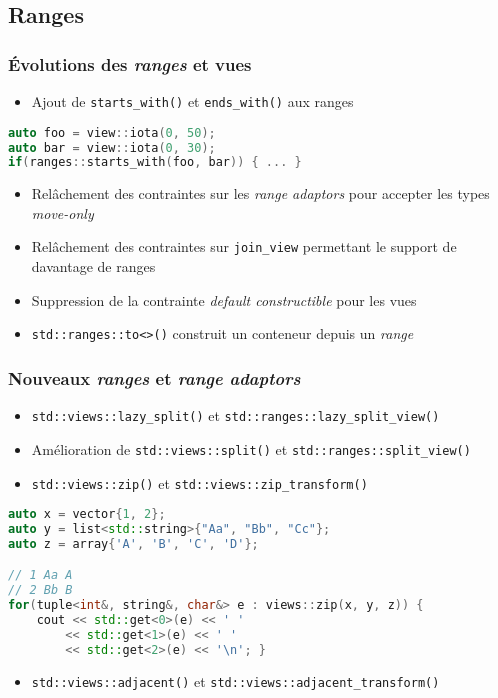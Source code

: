 \documentclass[C++.tex]{subfiles}
\begin{document}
\subsection*{Ranges}
\begin{frame}[fragile]
	\frametitle{Évolutions des \textit{ranges} et vues}
	\begin{itemize}
		\item Ajout de \lstinline|starts_with()| et \lstinline|ends_with()| aux ranges
	\end{itemize}

	\begin{lstlisting}[language=C++]
auto foo = view::iota(0, 50);
auto bar = view::iota(0, 30);
if(ranges::starts_with(foo, bar)) { ... }\end{lstlisting}

	\begin{itemize}
		\item Relâchement des contraintes sur les \textit{range adaptors} pour accepter les types \textit{move-only}
		\item Relâchement des contraintes sur \lstinline|join_view| permettant le support de davantage de ranges


		\item Suppression de la contrainte \textit{default constructible} pour les vues
		\item \lstinline|std::ranges::to<>()| construit un conteneur depuis un \textit{range}
	\end{itemize}
\end{frame}

\begin{frame}[fragile]
	\frametitle{Nouveaux \textit{ranges} et \textit{range adaptors}}
	\begin{itemize}
		\item \lstinline|std::views::lazy_split()| et \lstinline|std::ranges::lazy_split_view()|
		\item Amélioration de \lstinline|std::views::split()| et \lstinline|std::ranges::split_view()| 
		\item \lstinline|std::views::zip()| et \lstinline|std::views::zip_transform()|
	\end{itemize}

\begin{lstlisting}[language=C++]
auto x = vector{1, 2};
auto y = list<std::string>{"Aa", "Bb", "Cc"};
auto z = array{'A', 'B', 'C', 'D'};

// 1 Aa A
// 2 Bb B
for(tuple<int&, string&, char&> e : views::zip(x, y, z)) {
	cout << std::get<0>(e) << ' ' 
		<< std::get<1>(e) << ' '
		<< std::get<2>(e) << '\n'; }\end{lstlisting}

	\begin{itemize}
		\item \lstinline|std::views::adjacent()| et \lstinline|std::views::adjacent_transform()|
	\end{itemize}
\end{frame}
\end{document}
